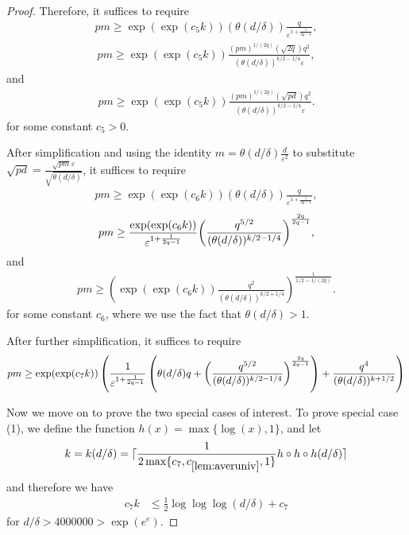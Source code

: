 \documentclass[11pt]{amsart}
\numberwithin{equation}{section}
\numberwithin{equation}{section}
\DeclarePairedDelimiter{\paren}{(}{)}
\begin{document}
\begin{proof}
Therefore, it suffices to require
\begin{align*}
    pm \ge \exp(\exp(c_{5}k))(\theta(d/\delta))\frac{q}{\varepsilon^{1+\frac{1}{2q-1}}},
\end{align*}
\begin{align*}
    {pm } \ge {\exp(\exp(c_5k))}\frac{(pm)^{1/(2q)}(\sqrt{2q}) q^{2}}{(\theta(d/\delta))^{k/2-1/4}\varepsilon},
\end{align*}
and
\begin{align*}
    {pm } \ge {\exp(\exp(c_5k))}\frac{(pm)^{1/(2q)}(\sqrt{pd}) q^{2}}{(\theta(d/\delta))^{k/2-1/4}\varepsilon}.
\end{align*}
for some constant $c_5>0$. 

After simplification and using the identity $m=\theta(d/\delta)\frac{d}{\varepsilon^2}$ to substitute $\sqrt{pd} = \frac{\sqrt{pm}\varepsilon}{\sqrt{\theta(d/\delta)}}$, it suffices to require
\begin{align*}
    pm \ge \exp(\exp(c_{6}k))(\theta(d/\delta))\frac{q}{\varepsilon^{1+\frac{1}{2q-1}}},
\end{align*}
\begin{align*}
    {pm } \ge \frac{\exp(\exp(c_6k))}{\varepsilon^{1+\frac{1}{2q-1}}} \paren*{\frac{q^{5/2}}{(\theta(d/\delta))^{k/2-1/4}}}^\frac{2q}{2q-1},
\end{align*}
and
\begin{align*}
    {pm } \ge ({\exp(\exp(c_6k))}\frac{ q^{2}}{(\theta(d/\delta))^{k/2+1/4}})^{\frac{1}{1/2-1/(2q)}}.
\end{align*}
for some constant $c_6$, where we use the fact that $\theta(d/\delta)>1$. 

After further simplification, it suffices to require
\begin{equation}\label{eq: sparsityreq}
\begin{aligned}
    {pm } \ge {\exp(\exp(c_7k))}\left(\frac{1}{\varepsilon^{1+\frac{1}{2q-1}}}\left(\theta(d/\delta)q+\paren*{\frac{q^{5/2}}{(\theta(d/\delta))^{k/2-1/4}}}^\frac{2q}{2q-1} \right)+\frac{ q^{4}}{(\theta(d/\delta))^{k+1/2}}\right)
\end{aligned}
\end{equation}

Now we move on to prove the two special cases of interest. To prove special case (1), we define the function $h(x)=\max\{\log(x),1\}$, and let
\begin{align*}
    k=k(d/\delta)=\lceil\frac{1}{2\max \{c_7, c_{\ref{lem:averuniv}}, 1\}}h \circ h \circ h (d/\delta)\rceil
\end{align*}
and therefore we have
\begin{align*}
    c_7 k &\le \frac{1}{2} \log\log\log (d/\delta)+c_7
\end{align*}
for $d/\delta >4000000 >\exp(e^e)$.


\end{proof}
\end{document}
